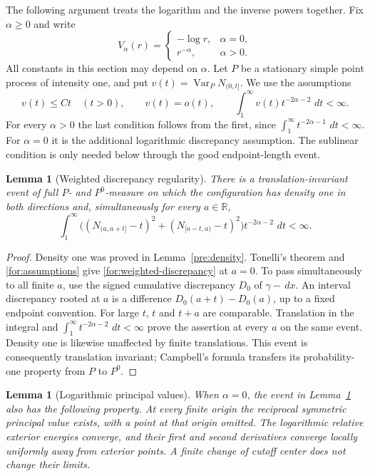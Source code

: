 \documentclass[11pt,reqno]{amsart}
\numberwithin{equation}{section}
\newtheorem{lemma}[theorem]{Lemma}
\theoremstyle{definition}
\newcommand{\R}{\mathbb R}
\newcommand{\1}{\mathbf 1}
\newcommand{\dd}{\,d}
\begin{document}
The following argument treats the logarithm and the inverse powers
together.  Fix $\alpha\ge0$ and write
\[
 V_\alpha(r)=
 \begin{cases}-\log r,&\alpha=0,\\ r^{-\alpha},&\alpha>0.
 \end{cases}
\]
All constants in this section may depend on $\alpha$.  Let $P$ be a
stationary simple point process of intensity one, and put
$v(t)=\operatorname{Var}_P N_{(0,t]}$.  We use the assumptions
\begin{equation}\label{for:assumptions}
 v(t)\le Ct\quad(t>0),\qquad v(t)=o(t),\qquad
 \int_1^\infty v(t)t^{-2\alpha-2}\,\dd t<\infty.
\end{equation}
For every $\alpha>0$ the last condition follows from the first, since
$\int_1^\infty t^{-2\alpha-1}\,\dd t<\infty$.  For $\alpha=0$ it
is the additional logarithmic discrepancy assumption.  The sublinear
condition is only needed below through the good endpoint-length event.

\begin{lemma}[Weighted discrepancy regularity]\label{for:regularity}
There is a translation-invariant event of full $P$- and $P^0$-measure
on which the configuration has density one in both directions and,
simultaneously for every $a\in\R$,
\begin{equation}\label{for:weighted-discrepancy}
 \int_1^\infty
 \bigl((N_{(a,a+t]}-t)^2+(N_{[a-t,a)}-t)^2\bigr)
 t^{-2\alpha-2}\,\dd t<\infty.
\end{equation}
\end{lemma}

\begin{proof}
Density one was proved in Lemma~\ref{pre:density}.
Tonelli's theorem and \eqref{for:assumptions} give
\eqref{for:weighted-discrepancy} at $a=0$.  To pass simultaneously to
all finite $a$, use the signed cumulative discrepancy $D_0$ of
$\gamma-\dd x$.  An interval discrepancy rooted at $a$ is a difference
$D_0(a+t)-D_0(a)$, up to a fixed endpoint convention.  For large $t$,
$t$ and $t+a$ are comparable.  Translation in the integral and
$\int_1^\infty t^{-2\alpha-2}\,\dd t<\infty$ prove the assertion
at every $a$ on the same event.  Density one is likewise unaffected by
finite translations.  This event is consequently translation invariant;
Campbell's formula transfers its probability-one property from $P$ to
$P^0$.
\end{proof}

\begin{lemma}[Logarithmic principal values]\label{for:log-pv}
When $\alpha=0$, the event in Lemma~\ref{for:regularity} also has
the following property. At every finite origin the reciprocal
symmetric principal value exists, with a point at that origin omitted.
The logarithmic relative exterior energies converge, and their first
and second derivatives converge locally uniformly away from exterior
points. A finite change of cutoff center does not change their limits.
\end{lemma}
\end{document}
